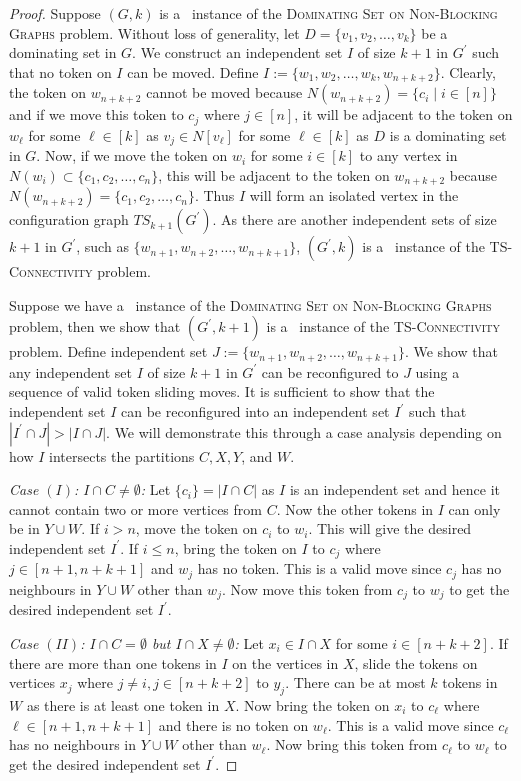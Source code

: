 \begin{proof}
Suppose $(G,k)$ is a \yes\ instance of the
\textsc{Dominating Set on Non-Blocking Graphs} problem. 
Without loss of generality, let $D=\{v_1,v_2,\ldots,v_k\}$
be a dominating set in $G$. 
We construct an independent set $I$ of size $k+1$ in $G^\prime$ 
such that no token on $I$ can be moved. 
Define $I :=\{w_1,w_2,\ldots,w_k,w_{n+k+2}\}$. 
Clearly, the token on $w_{n+k+2}$ cannot be moved because 
$N(w_{n+k+2})=\{c_i \mid i\in [n]\}$ and 
if we move this token to $c_j$ where $j\in [n]$, 
it will be adjacent to the token on $w_\ell$ for some 
$\ell \in [k]$ as $v_j\in N[v_\ell]$ for some $\ell\in [k]$ as $D$
is a dominating set in $G$. 
Now, if we move the token on $w_i$ for some $i\in [k]$ to any vertex 
in $N(w_i)\subset \{c_1,c_2,\ldots,c_n\}$, this will be adjacent to the 
token on $w_{n+k+2}$ because $N(w_{n+k+2})= \{c_1,c_2,\ldots,c_n\}$.
Thus $I$ will form an isolated vertex in the configuration graph 
$TS_{k+1}(G^\prime)$. 
As there are another independent sets of size $k+1$ in $G^\prime$,
such as $\{w_{n+1}, w_{n+2}, \dots, w_{n+k+1}\}$, 
$(G^{\prime}, k)$ is a \no\ instance of the \textsc{TS-Connectivity} problem. 

Suppose we have a \no\ instance of the
\textsc{Dominating Set on Non-Blocking Graphs} problem, 
then we show that $(G^\prime,k+1)$ is a \yes\ instance of the
\textsc{TS-Connectivity} problem. 
Define independent set $J:=\{w_{n+1},w_{n+2},\ldots,w_{n+k+1}\}$.
We show that any independent set $I$ of size $k+1$ in 
$G^\prime$ can be reconfigured to $J$ using a sequence 
of valid token sliding moves. 
It is sufficient to show that the independent set $I$ can be reconfigured 
into an independent set $I^\prime$ such that $|I^\prime\cap J|>|I\cap J|$. 
We will demonstrate this through a case analysis depending 
on how $I$ intersects the partitions $C, X, Y$, and $W$.

\emph{Case $(I)$: $I\cap C\neq \emptyset$:}
Let $\{c_i\}=|I\cap C|$ as $I$ is an independent set and 
hence it cannot contain two or more vertices from $C$. 
Now the other tokens in $I$ can only be in $Y\cup W$. 
If $i>n$, move the token on $c_i$ to $w_i$. 
This will give the desired independent set $I^\prime$. 
If $i\leq n$, bring the token on $I$ to $c_j$ where $j\in [n+1,n+k+1]$
and $w_j$ has no token. 
This is a valid move since $c_j$ has no neighbours in $Y\cup W$ 
other than $w_j$. 
Now move this token from $c_j$ to $w_j$ to get the desired 
independent set $I^\prime$.

\emph{Case $(II)$: $I\cap C=\emptyset$ but $I\cap X\neq \emptyset$:}
Let $x_i\in I\cap X$ for some $i\in [n+k+2]$. 
If there are more than one tokens in $I$ on the vertices in $X$, 
slide the tokens on vertices $x_j$ where $j\neq i, j\in [n+k+2]$ to $y_j$. 
There can be at most $k$ tokens in $W$ 
as there is at least one token in $X$.
Now bring the token on $x_i$ to $c_\ell$ where $\ell\in [n+1,n+k+1]$ and there is no token on $w_\ell$. This is a valid move since $c_\ell$ has no neighbours in $Y\cup W$ other than $w_\ell$. Now bring this token from $c_\ell$ to $w_\ell$ to get the desired independent set $I^\prime$.


\end{proof}

